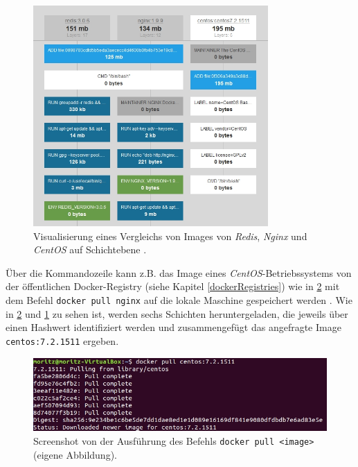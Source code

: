 \documentclass[../main.tex]{subfiles}
\begin{document}
			\begin{figure}[!htbp]
          \centering
          \includegraphics[width=0.8\textwidth]{./images/intro_imagelayers.jpg}
          \caption{Visualisierung eines Vergleichs von Images von \emph{Redis}, \emph{Nginx} und \emph{CentOS} auf Schichtebene \cite{dockerImagelayers}.}
          \label{fig:intro_imagelayers}
      \end{figure}


      Über die Kommandozeile kann z.B. das Image eines \emph{CentOS}-Betriebssystems von der öffentlichen Docker-Registry (siehe Kapitel \ref{dockerRegistries}) wie in \fig \ref{fig:intro_dockerPull} mit dem Befehl \texttt{docker pull nginx} auf die lokale Maschine gespeichert werden \cite{dockerHubNginx}\cite{dockerPull}. Wie in \fig \ref{fig:intro_dockerPull} und \fig \ref{fig:intro_imagelayers} zu sehen ist, werden sechs Schichten heruntergeladen, die jeweils über einen Hashwert identifiziert werden und zusammengefügt das angefragte Image \texttt{centos:7.2.1511} ergeben.

			\begin{figure}[!htbp]
          \centering
          \includegraphics[width=1.0\textwidth]{./images/intro_dockerPull.jpg}
          \caption{Screenshot von der Ausführung des Befehls \texttt{docker pull <image>} (eigene Abbildung).}
          \label{fig:intro_dockerPull}
      \end{figure}
\end{document}
